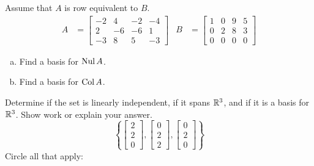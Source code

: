 \newpage

\begin{exercise} %
	Assume that $A$ is row equivalent to $B$.
	\begin{align*}
	A &= \begin{bmatrix} -2&4&-2&-4 \\ 2&-6&-6&1 \\ -3&8&5&-3 \end{bmatrix} &
	B &= \begin{bmatrix} 1&0&9&5 \\ 0&2&8&3 \\ 0&0&0&0 \end{bmatrix}
	\end{align*}
	\begin{multicols}{2}
		\begin{enumerate}[(a)]
			\item Find a basis for $\operatorname{Nul} A$.
			\item Find a basis for $\operatorname{Col} A$.
		\end{enumerate}
	\end{multicols}
\end{exercise}
\vfill

\begin{exercise} %
	Determine if the set is linearly independent, if it spans $\mathbb{R}^3$, and if it is a basis for $\mathbb{R}^3$. Show work or explain your answer.
	$$ \left\{
	\begin{bmatrix}2\\2\\0\end{bmatrix},
	\begin{bmatrix}0\\2\\2\end{bmatrix},
	\begin{bmatrix}0\\2\\0\end{bmatrix}
	\right\} $$
	Circle all that apply:
	\begin{center}
	 \hspace{5em}
	 \hspace{5em}
	\end{center}
\end{exercise}
\vfill

